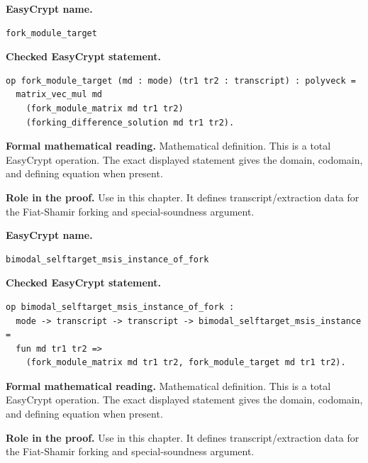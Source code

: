 \begin{formaldefinition}
\noindent\textbf{EasyCrypt name.}
\begin{lstlisting}[language=EasyCrypt,basicstyle=\ttfamily\scriptsize]
fork_module_target
\end{lstlisting}
\noindent\textbf{Checked EasyCrypt statement.}
\begin{lstlisting}[language=EasyCrypt,basicstyle=\ttfamily\scriptsize]
op fork_module_target (md : mode) (tr1 tr2 : transcript) : polyveck =
  matrix_vec_mul md
    (fork_module_matrix md tr1 tr2)
    (forking_difference_solution md tr1 tr2).
\end{lstlisting}
\noindent\textbf{Formal mathematical reading.}
Mathematical definition. This is a total EasyCrypt operation.  The exact displayed statement gives the domain, codomain, and defining equation when present.

\noindent\textbf{Role in the proof.}
Use in this chapter. It defines transcript/extraction data for the Fiat-Shamir forking and special-soundness argument.

\end{formaldefinition}

\begin{formaldefinition}
\noindent\textbf{EasyCrypt name.}
\begin{lstlisting}[language=EasyCrypt,basicstyle=\ttfamily\scriptsize]
bimodal_selftarget_msis_instance_of_fork
\end{lstlisting}
\noindent\textbf{Checked EasyCrypt statement.}
\begin{lstlisting}[language=EasyCrypt,basicstyle=\ttfamily\scriptsize]
op bimodal_selftarget_msis_instance_of_fork :
  mode -> transcript -> transcript -> bimodal_selftarget_msis_instance =
  fun md tr1 tr2 =>
    (fork_module_matrix md tr1 tr2, fork_module_target md tr1 tr2).
\end{lstlisting}
\noindent\textbf{Formal mathematical reading.}
Mathematical definition. This is a total EasyCrypt operation.  The exact displayed statement gives the domain, codomain, and defining equation when present.

\noindent\textbf{Role in the proof.}
Use in this chapter. It defines transcript/extraction data for the Fiat-Shamir forking and special-soundness argument.

\end{formaldefinition}

